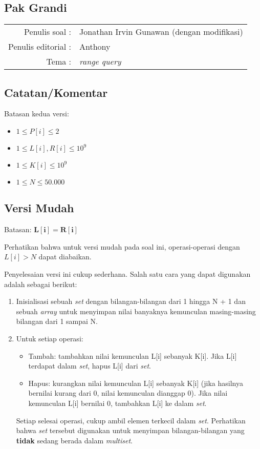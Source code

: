 \documentclass[../main_editorial.tex]{subfiles} %
\newcommand{\problemName}{Pak Grandi}
\newcommand{\problemWriter}{Jonathan Irvin Gunawan (dengan modifikasi)}
\newcommand{\problemEditorialWriter}{Anthony}
\newcommand{\problemTags}{\textit{range query}}
\begin{document}
\begin{center}
    \section*{\problemName}
    \addcontentsline{toc}{section}{\problemName} %
    
    \begin{tabular}{rl}
    Penulis soal : & \problemWriter \\
    Penulis editorial : & \problemEditorialWriter \\
    Tema : & \problemTags
    \end{tabular}
\end{center}

\subsection*{Catatan/Komentar}

Batasan kedua versi:
\begin{itemize}
	\item $1 \le P[i] \le 2$
	\item $1 \le L[i], R[i] \le 10^9$
	\item $1 \le K[i] \le 10^9$
	\item $1 \le N \le 50.000$
\end{itemize}

\subsection*{Versi Mudah}
Batasan: $\mathbf{L[i]=R[i]}$

Perhatikan bahwa untuk versi mudah pada soal ini, operasi-operasi dengan $L[i] > N$ dapat diabaikan.

Penyelesaian versi ini cukup sederhana. Salah satu cara yang dapat digunakan adalah sebagai berikut:

\begin{enumerate}
	\item Inisialisasi sebuah \textit{set} dengan bilangan-bilangan dari 1 hingga N + 1 dan sebuah \textit{array} untuk menyimpan nilai banyaknya kemunculan masing-masing bilangan dari 1 sampai N.
	\item Untuk setiap operasi:
		\begin{itemize}
			\item Tambah: tambahkan nilai kemunculan L[i] sebanyak K[i]. Jika L[i] terdapat dalam \textit{set}, hapus L[i] dari \textit{set}.
			\item Hapus: kurangkan nilai kemunculan L[i] sebanyak K[i] (jika hasilnya bernilai kurang dari 0, nilai kemunculan dianggap 0). Jika nilai kemunculan L[i] bernilai 0, tambahkan L[i] ke dalam \textit{set}.
		\end{itemize}
		Setiap selesai operasi, cukup ambil elemen terkecil dalam \textit{set}. Perhatikan bahwa \textit{set} tersebut digunakan untuk menyimpan bilangan-bilangan yang \textbf{tidak} sedang berada dalam \textit{multiset}.
\end{enumerate}
\end{document}
